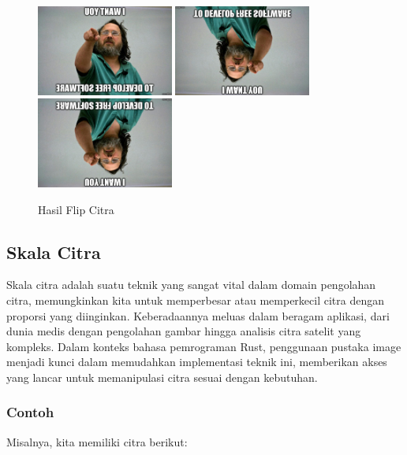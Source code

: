 \documentclass[a4paper,12pt,openany]{book}
\begin{document}
\begin{figure}[H]
    \centering
    \includegraphics[width=0.4\textwidth]{./image/geometry/stallman-meme-flipped-x.jpg}
    \includegraphics[width=0.4\textwidth]{./image/geometry/stallman-meme-flipped-y.jpg}
    \includegraphics[width=0.4\textwidth]{./image/geometry/stallman-meme-flipped-xy.jpg}
    \caption{Hasil Flip Citra}
\end{figure}

\subsection{Skala Citra}

Skala citra adalah suatu teknik yang sangat vital dalam domain pengolahan citra, memungkinkan kita untuk memperbesar atau memperkecil citra dengan proporsi yang diinginkan. Keberadaannya meluas dalam beragam aplikasi, dari dunia medis dengan pengolahan gambar hingga analisis citra satelit yang kompleks. Dalam konteks bahasa pemrograman Rust, penggunaan pustaka image menjadi kunci dalam memudahkan implementasi teknik ini, memberikan akses yang lancar untuk memanipulasi citra sesuai dengan kebutuhan.

\subsubsection{Contoh}
Misalnya, kita memiliki citra berikut:
\end{document}
